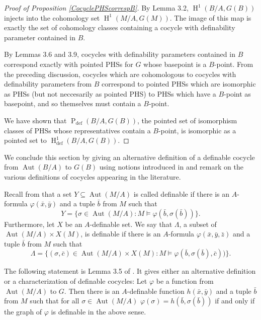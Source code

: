\documentclass{article}
\theoremstyle{problemstyle}
\DeclareMathOperator{\defin}{def} %
\DeclareMathOperator{\aut}{Aut} %
\DeclareMathOperator{\HH}{H} %
\DeclareMathOperator{\PP}{P} %
\begin{document}
\begin{proof}[Proof of Proposition \ref{CocyclePHScorrespB}]
    By Lemma 3.2, $\HH^1(B/A,G(B))$ injects into  the cohomology set $\HH^1(M/A,G(M))$. The image of this map is exactly the set of cohomology classes containing a cocycle with definability parameter contained in $B$. 
    
    By Lemmas 3.6 and 3.9, cocycles with definability parameters contained in $B$ correspond exactly with pointed PHSs for $G$ whose basepoint is a $B$-point. From the preceding discussion, cocycles which are cohomologous to cocycles with definability parameters from $B$ correspond to pointed PHSs which are isomorphic as PHSs (but not neccesarily as pointed PHS) to PHSs which have a $B$-point as basepoint, and so themselves must contain a $B$-point. 
    
    We have shown that $\PP_{\defin}(B/A,G(B))$, the pointed set of isomorphism classes of PHSs whose representatives contain a $B$-point, is isomorphic as a pointed set to $\HH^{1}_{\defin}(B/A,G(B))$. 
\end{proof}


We conclude this section by giving an alternative definition of a definable cocycle from $\aut(B/A)$ to $G(B)$ using notions introduced in \cite{pillay2024automorphism} and remark on the various definitions of cocycles appearing in the literature. 

Recall from \cite{pillay2024automorphism} that a set $Y \subseteq \aut(M/A)$ is called definable if there is an $A$-formula $\varphi(\bar{x},\bar{y})$ and a tuple $\bar{b}$ from $M$ such that $$Y = \{\sigma \in \aut(M/A) :  M \models \varphi(\bar{b},\sigma(\bar{b}))\}.$$ Furthermore, let $X$ be an $A$-definable set. We say that $\Lambda$, a subset of $\aut(M/A)\times X(M)$, is definable if there is an $A$-formula $\varphi(\bar{x},\bar{y},\bar{z})$ and a tuple $\bar{b}$ from $M$ such that $$\Lambda = \{(\sigma,\bar{c}) \in \aut(M/A)\times X(M
): M \models \varphi(\bar{b},\sigma(\bar{b}),\bar{c}))\}.$$

The following statement is Lemma 3.5 of \cite{pillay2024automorphism}. It gives either an alternative definition or a characterization of definable cocycles: Let $\varphi$ be a function from $\aut(M/A)$ to $G$. Then there is an $A$-definable function $h(\bar{x},\bar{y})$ and a tuple $\bar{b}$ from $M$ such that for all $\sigma \in \aut(M/A)$ $\varphi(\sigma) = h(\bar{b},\sigma(\bar{b}))$ if and only if the graph of $\varphi$ is definable in the above sense. 
\end{document}
